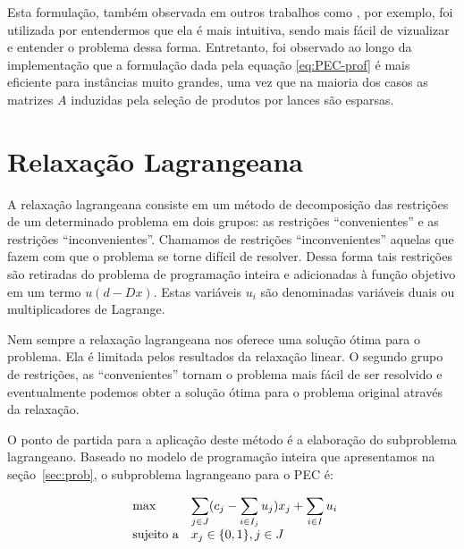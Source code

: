 \documentclass{article}
\begin{document}
    Esta formulação, também observada em outros trabalhos como \cite{guo2005using}, por exemplo, foi utilizada por entendermos que ela é mais intuitiva, sendo mais fácil de vizualizar e entender o problema dessa forma. Entretanto, foi observado ao longo da implementação que a formulação dada pela equação \ref{eq:PEC-prof} é mais eficiente para instâncias muito grandes, uma vez que na maioria dos casos as matrizes $ A $ induzidas pela seleção de produtos por lances são esparsas. 
	
	
	\section{Relaxação Lagrangeana}\label{sec:relag}
	A relaxação lagrangeana consiste em um método de decomposição das restrições de um determinado problema em dois grupos: as restrições \enquote{convenientes} e as restrições \enquote{inconvenientes}. 
	Chamamos de restrições \enquote{inconvenientes} aquelas que fazem com que o problema se torne difícil de resolver. Dessa forma tais restrições são
	retiradas do problema de programação inteira e adicionadas à função objetivo em um termo $u(d - Dx)$. Estas variáveis $u_i$ são denominadas variáveis duais ou multiplicadores de Lagrange.
	
	Nem sempre a relaxação lagrangeana nos oferece uma solução ótima para o problema. Ela é limitada pelos resultados da relaxação linear. O segundo grupo de restrições, as \enquote{convenientes} tornam o problema mais fácil de ser resolvido e eventualmente podemos obter a solução ótima para o problema original através da relaxação.
	
	O ponto de partida para a aplicação deste método é a elaboração do subproblema lagrangeano. Baseado no modelo de programação inteira que apresentamos na seção~\ref{sec:prob}, o subproblema lagrangeano para o PEC é: 
	
	\begin{equation*}
        \begin{array}{ll@{}ll}
            \text{max}  & \displaystyle\sum\limits_{j \in J} (c_{j} - \displaystyle\sum\limits_{i \in I_j} u_{j})x_j+  \displaystyle\sum\limits_{i \in I} u_{i}\\
            \text{sujeito a}
                 &                                                x_{j} \in \{0,1\}, j \in J
        \end{array}
    \end{equation*}
	
	
\end{document}
